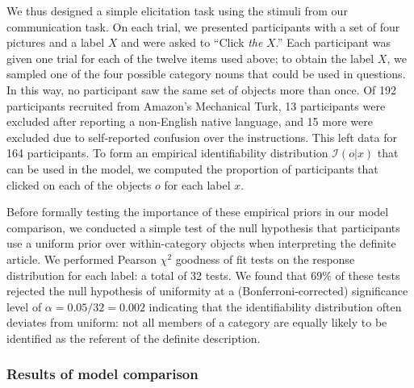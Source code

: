 \documentclass[11pt, floatsintext]{apa6}
\begin{document}
We thus designed a simple elicitation task using the stimuli from our communication task.
On each trial, we presented participants with a set of four pictures and a label $X$ and were asked to ``Click \emph{the} $X$.''
Each participant was given one trial for each of the twelve items used above; to obtain the label $X$, we sampled one of the four possible category nouns that could be used in questions. 
In this way, no participant saw the same set of objects more than once. 
Of 192 participants recruited from Amazon's Mechanical Turk, 13 participants were excluded after reporting a non-English native language, and 15 more were excluded due to self-reported confusion over the instructions. 
This left data for 164 participants.
To form an empirical identifiability distribution $\mathcal{I}(o | x)$ that can be used in the model, we computed the proportion of participants that clicked on each of the objects $o$ for each label $x$. 

Before formally testing the importance of these empirical priors in our model comparison, we conducted a simple test of the null hypothesis that participants use a uniform prior over within-category objects when interpreting the definite article. 
We performed Pearson $\chi^2$ goodness of fit tests on the response distribution for each label: a total of 32 tests. 
We found that 69\% of these tests rejected the null hypothesis of uniformity at a (Bonferroni-corrected) significance level of $\alpha = 0.05/32 = 0.002$ indicating that the identifiability distribution often deviates from uniform: not all members of a category are equally likely to be identified as the referent of the definite description.

\subsubsection{Results of model comparison}

\end{document}
